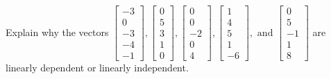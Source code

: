 \documentclass{article}
\begin{document}
\begin{exerciseStatement}
    Explain why the vectors \(\left[\begin{array}{r}
-3 \\
0 \\
-3 \\
-4 \\
-1
\end{array}\right] , \left[\begin{array}{r}
0 \\
5 \\
3 \\
1 \\
0
\end{array}\right] , \left[\begin{array}{r}
0 \\
0 \\
-2 \\
0 \\
4
\end{array}\right] , \left[\begin{array}{r}
1 \\
4 \\
5 \\
1 \\
-6
\end{array}\right] , \text{ and } \left[\begin{array}{r}
0 \\
5 \\
-1 \\
1 \\
8
\end{array}\right]\) are linearly dependent or linearly independent.


  
\end{exerciseStatement}
\end{document}
